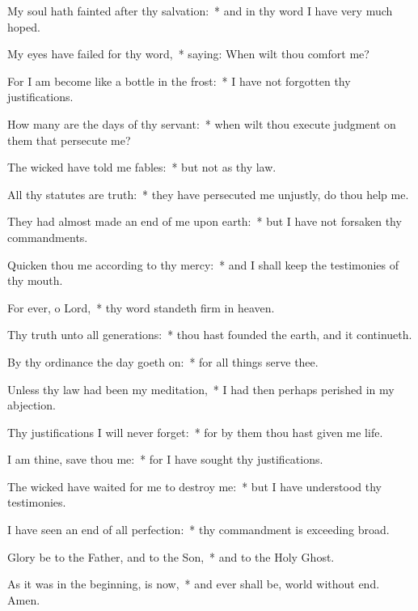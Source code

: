 \begin{enpars}
\item My soul hath fainted after thy salvation:~* and in thy word I have very much hoped.
\item My eyes have failed for thy word,~* saying: When wilt thou comfort me?
\item For I am become like a bottle in the frost:~* I have not forgotten thy justifications.
\item How many are the days of thy servant:~* when wilt thou execute judgment on them that persecute me?
\item The wicked have told me fables:~* but not as thy law.
\item All thy statutes are truth:~* they have persecuted me unjustly, do thou help me.
\item They had almost made an end of me upon earth:~* but I have not forsaken thy commandments.
\item Quicken thou me according to thy mercy:~* and I shall keep the testimonies of thy mouth.
\item For ever, o Lord,~* thy word standeth firm in heaven.
\item Thy truth unto all generations:~* thou hast founded the earth, and it continueth.
\item By thy ordinance the day goeth on:~* for all things serve thee.
\item Unless thy law had been my meditation,~* I had then perhaps perished in my abjection.
\item Thy justifications I will never forget:~* for by them thou hast given me life.
\item I am thine, save thou me:~* for I have sought thy justifications.
\item The wicked have waited for me to destroy me:~* but I have understood thy testimonies.
\item I have seen an end of all perfection:~* thy commandment is exceeding broad.
\item Glory be to the Father, and to the Son,~* and to the Holy Ghost.
\item As it was in the beginning, is now,~* and ever shall be, world without end. Amen.
\end{enpars}